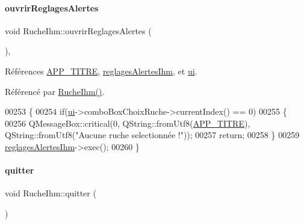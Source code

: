 \mbox{\label{class_ruche_ihm_ab8db02641e73f348fd6162321a3765da}} 
\paragraph{\texorpdfstring{ouvrir\+Reglages\+Alertes}{ouvrirReglagesAlertes}}
{\footnotesize\ttfamily void Ruche\+Ihm\+::ouvrir\+Reglages\+Alertes (\begin{DoxyParamCaption}{ }\end{DoxyParamCaption})\hspace{0.3cm}{\ttfamily [private]}, {\ttfamily [slot]}}



Références \hyperlink{parametres_8h_ace364d1ce44aa9f79bcff6e3752c4a5f}{A\+P\+P\+\_\+\+T\+I\+T\+RE}, \hyperlink{class_ruche_ihm_a04068fbec978c2443f3baf08d4945929}{reglages\+Alertes\+Ihm}, et \hyperlink{class_ruche_ihm_a64786058bd7f88ca2f1e9743bb27c25b}{ui}.



Référencé par \hyperlink{class_ruche_ihm_a04c2544ba4e9cca6c38f553c32d63dee}{Ruche\+Ihm()}.


\begin{DoxyCode}
00253 \{
00254     \textcolor{keywordflow}{if}(\hyperlink{class_ruche_ihm_a64786058bd7f88ca2f1e9743bb27c25b}{ui}->comboBoxChoixRuche->currentIndex() == 0)
00255     \{
00256         QMessageBox::critical(0, QString::fromUtf8(\hyperlink{parametres_8h_ace364d1ce44aa9f79bcff6e3752c4a5f}{APP\_TITRE}), QString::fromUtf8(\textcolor{stringliteral}{"Aucune ruche
       selectionnée !"}));
00257         \textcolor{keywordflow}{return};
00258     \}
00259     \hyperlink{class_ruche_ihm_a04068fbec978c2443f3baf08d4945929}{reglagesAlertesIhm}->exec();
00260 \}
\end{DoxyCode}
\mbox{\label{class_ruche_ihm_a382502aff2ab21abf60f05bf573477fd}} 
\paragraph{\texorpdfstring{quitter}{quitter}}
{\footnotesize\ttfamily void Ruche\+Ihm\+::quitter (\begin{DoxyParamCaption}{ }\end{DoxyParamCaption})\hspace{0.3cm}{\ttfamily [slot]}}



